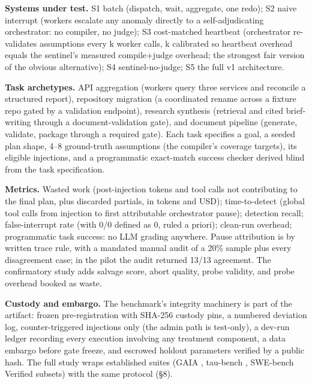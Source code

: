 \documentclass[acmsmall,screen,review,anonymous]{acmart}
\begin{document}
\textbf{Systems under test.} S1 batch (dispatch, wait, aggregate, one redo); S2 naive interrupt (workers escalate any anomaly directly to a self-adjudicating orchestrator: no compiler, no judge); S3 cost-matched heartbeat (orchestrator re-validates assumptions every k worker calls, k calibrated so heartbeat overhead equals the sentinel's measured compile+judge overhead; the strongest fair version of the obvious alternative); S4 sentinel-no-judge; S5 the full v1 architecture.

\textbf{Task archetypes.} API aggregation (workers query three services and reconcile a structured report), repository migration (a coordinated rename across a fixture repo gated by a validation endpoint), research synthesis (retrieval and cited brief-writing through a document-validation gate), and document pipeline (generate, validate, package through a required gate). Each task specifies a goal, a seeded plan shape, 4--8 ground-truth assumptions (the compiler's coverage targets), its eligible injections, and a programmatic exact-match success checker derived blind from the task specification.

\textbf{Metrics.} Wasted work (post-injection tokens and tool calls not contributing to the final plan, plus discarded partials, in tokens and USD); time-to-detect (global tool calls from injection to first attributable orchestrator pause); detection recall; false-interrupt rate (with 0/0 defined as 0, ruled a priori); clean-run overhead; programmatic task success: no LLM grading anywhere. Pause attribution is by written trace rule, with a mandated manual audit of a 20\% sample plus every disagreement case; in the pilot the audit returned 13/13 agreement. The confirmatory study adds salvage score, abort quality, probe validity, and probe overhead booked as waste.

\textbf{Custody and embargo.} The benchmark's integrity machinery is part of the artifact: frozen pre-registration with SHA-256 custody pins, a numbered deviation log, counter-triggered injections only (the admin path is test-only), a dev-run ledger recording every execution involving any treatment component, a data embargo before gate freeze, and escrowed holdout parameters verified by a public hash. The full study wraps established suites (GAIA \cite{ref31}, tau-bench \cite{ref32}, SWE-bench Verified subsets) with the same protocol (\S8).
\end{document}
